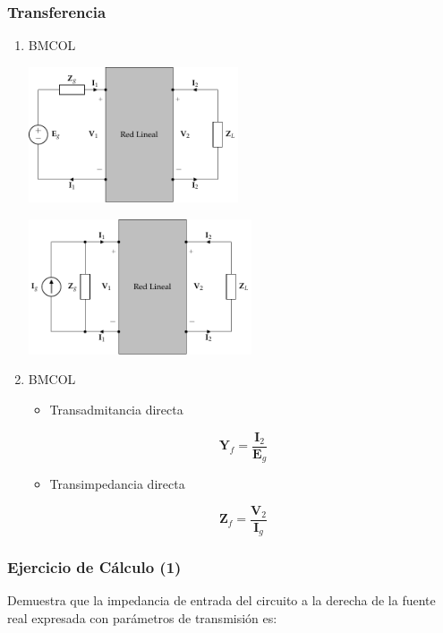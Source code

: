 \subsubsection{Transferencia}
\label{sec:orgb5d33e6}
\begin{enumerate}
\item \hfill{}\textsc{BMCOL}
\label{sec:org6258e98}
\begin{center}
\includegraphics[height=4cm]{../figs/cuadripolo_cargado_fuente_tension.pdf}
\end{center}
\begin{center}
\includegraphics[height=4cm]{../figs/cuadripolo_cargado_fuente_corriente.pdf}
\end{center}


\item \hfill{}\textsc{BMCOL}
\label{sec:org8c9bbdc}
\begin{itemize}
\item Transadmitancia directa
\end{itemize}
\[
\mathbf{Y}_f = \frac{\mathbf{I}_2}{\mathbf{E}_g}
\]

\begin{itemize}
\item Transimpedancia directa
\end{itemize}
\[
\mathbf{Z}_f = \frac{\mathbf{V}_2}{\mathbf{I}_g}
\]
\end{enumerate}

\subsubsection{Ejercicio de Cálculo (1)}
\label{sec:orgce5d563}

Demuestra que la impedancia de entrada del circuito a la derecha de la fuente real expresada con parámetros de transmisión es:

